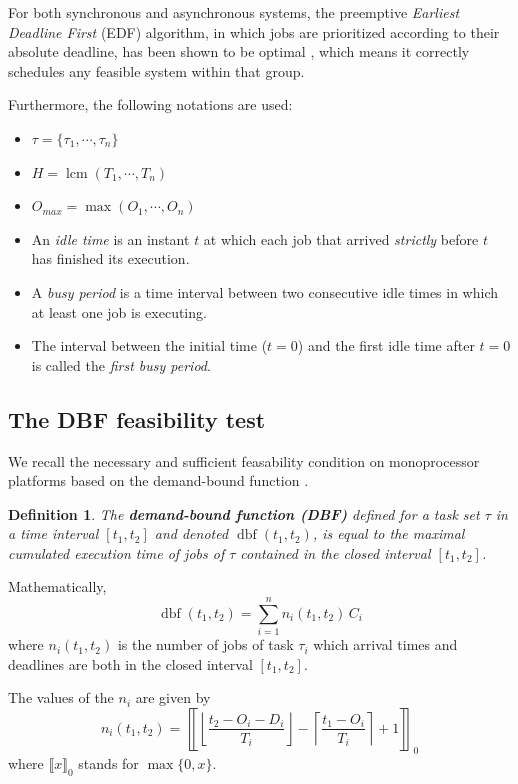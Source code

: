 \documentclass[conference]{IEEEtran}
\newtheorem{definition}{Definition}
\newcommand{\dbf}[1]{\operatorname{dbf}(#1)}
\begin{document}
		For both synchronous and asynchronous systems, the preemptive
		\emph{Earliest Deadline First} (EDF) algorithm, in which jobs are prioritized according to their absolute deadline, has been
		shown to be optimal \cite{liu1973scheduling}, which means it
		correctly schedules any feasible system within that group.

		Furthermore, the following notations are used:
		\begin{itemize}
			\item $\tau = \{\tau_1, \cdots, \tau_{n}\}$
			\item $H = \operatorname{lcm}(T_1, \cdots, T_{n})$
			\item $O_{max} = \max (O_1, \cdots, O_{n})$
			\item An \emph{idle time} is an instant $t$ at which each job that arrived
			\emph{strictly} before $t$ has finished its execution.
			\item A \emph{busy period} is a time interval between two consecutive idle times in
			which at least one job is executing.
			\item The interval between the initial time ($t=0$) and the first
			idle time after $t=0$ is called the \emph{first busy period}.
		\end{itemize}

	\subsection{The DBF feasibility test}
		We recall the necessary and sufficient feasability condition on monoprocessor
		platforms based on the demand-bound function \cite{baruah1999generalized,
		baruah1990algorithms}.

		\begin{definition}
			The \textbf{demand-bound function (DBF)}
			defined for a task set $\tau$ in a time interval $[t_1, t_2]$ and denoted $\dbf{t_1, t_2}$, is
			equal to the maximal cumulated execution time of jobs of $\tau$ contained in the
			closed interval $[t_1, t_2]$.
		\end{definition}

		Mathematically,
		\begin{equation}
			\dbf{t_1, t_2} = \sum_{i=1}^{n} n_i(t_1, t_2) \, C_i
		\end{equation}
		where $n_i(t_1, t_2)$ is the number of jobs of task $\tau_i$ which arrival times
		and deadlines are both in the closed interval $[t_1, t_2]$.

		The values of the $n_i$ are given by \cite{baruah1999generalized}
		\begin{equation}
			n_i(t_1, t_2) =
			\left\llbracket
				\left\lfloor
					\frac{t_2 - O_i - D_i}{T_i}
				\right\rfloor -
				\left\lceil
					\frac{t_1 - O_i}{T_i}
				\right\rceil + 1
			\right\rrbracket_0
		\end{equation}
		where $\llbracket x \rrbracket_0$ stands for $\max \{ 0, x \}$.
\end{document}
